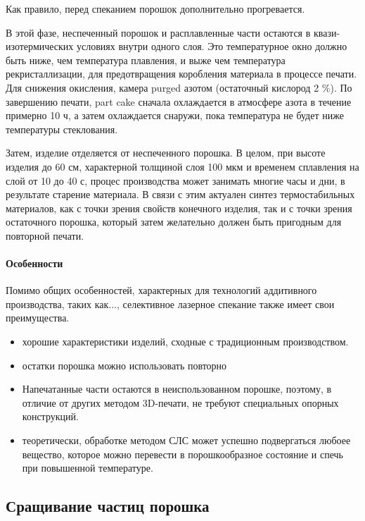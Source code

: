 Как правило, перед спеканием порошок дополнительно прогревается.

В этой фазе, неспеченный порошок и расплавленные части остаются в квази-изотермических условиях внутри одного слоя.
Это температурное окно должно быть ниже, чем температура плавления, и выже чем температура рекристаллизации, для предотвращения коробления материала в процессе печати.
Для снижения окисления, камера purged азотом (остаточный кислород 2 \%). По завершению печати, part cake сначала охлаждается в атмосфере азота в течение примерно 10 ч, а затем охлаждается снаружи, пока температура не будет ниже температуры стеклования.

Затем, изделие отделяется от неспеченного порошка. В целом, при высоте изделия до 60 см, характерной толщиной слоя 100 мкм и временем сплавления на слой от 10 до 40 с, процес производства может занимать многие часы и дни, в результате старение материала. В связи с этим актуален синтез термостабильных материалов, как с точки зрения свойств конечного изделия, так и с точки зрения остаточного порошка, который затем желательно должен быть пригодным для повторной печати.



\paragraph{Особенности}
Помимо общих особенностей, характерных для технологий аддитивного производства, таких как..., селективное лазерное спекание также имеет свои преимущества.
\begin{itemize}
    \item хорошие характеристики изделий, сходные с традиционным производством.
    \item остатки порошка можно использовать повторно
    \item Напечатанные части остаются в неиспользованном порошке, поэтому, в отличие от других методом 3D-печати, не требуют специальных опорных конструкций.
    \item теоретически, обработке методом СЛС может успешно подвергаться любоее вещество, которое можно перевести в порошкообразное состояние и спечь при повышенной температуре\cite{vaganov}.
\end{itemize}



\subsection{Сращивание частиц порошка}

